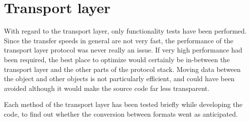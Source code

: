 \section{Transport layer}
With regard to the transport layer, only functionality tests have been performed. Since the transfer speeds in general are not very fast, the performance of the transport layer protocol was never really an issue. If very high performance had been required, the best place to optimize would certainly be in-between the transport layer and the other parts of the protocol stack. Moving data between the  object and other objects is not particularly efficient, and could have been avoided although it would make the source code far less transparent.

Each method of the transport layer has been tested briefly while developing the code, to find out whether the conversion between formats went as anticipated.